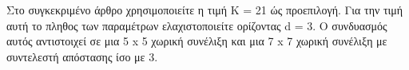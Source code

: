 \documentclass[12pt]{article}
\numberwithin{equation}{section}
\begin{document}
\noindent Στο συγκεκριμένο άρθρο χρησιμοποιείτε η τιμή K = 21 ώς προεπιλογή. Για την τιμή αυτή το πληθος των παραμέτρων ελαχιστοποιείτε ορίζοντας d = 3. Ο συνδυασμός αυτός αντιστοιχεί σε μια 5 x 5 χωρική συνέλιξη και μια 7 x 7 χωρική συνέλιξη με συντελεστή απόστασης ίσο με 3.\\

\newpage

\renewcommand{\refname}{Βιβλιογραφική αναφορά}




 
\end{document}
